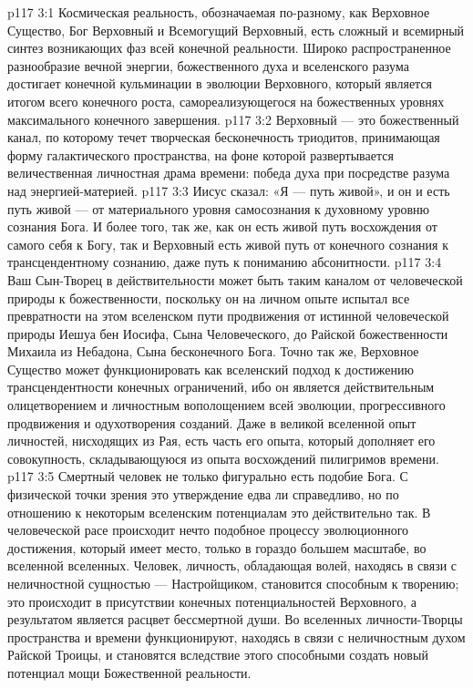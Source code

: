 \vs p117 3:1 Космическая реальность, обозначаемая по\hyp{}разному, как Верховное Существо, Бог Верховный и Всемогущий Верховный, есть сложный и всемирный синтез возникающих фаз всей конечной реальности. Широко распространенное разнообразие вечной энергии, божественного духа и вселенского разума достигает конечной кульминации в эволюции Верховного, который является итогом всего конечного роста, самореализующегося на божественных уровнях максимального конечного завершения.
\vs p117 3:2 Верховный --- это божественный канал, по которому течет творческая бесконечность триодитов, принимающая форму галактического пространства, на фоне которой развертывается величественная личностная драма времени: победа духа при посредстве разума над энергией\hyp{}материей.
\vs p117 3:3 \pc Иисус сказал: «Я --- путь живой», и он и есть путь живой --- от материального уровня самосознания к духовному уровню сознания Бога. И более того, так же, как он есть живой путь восхождения от самого себя к Богу, так и Верховный есть живой путь от конечного сознания к трансцендентному сознанию, даже путь к пониманию абсонитности.
\vs p117 3:4 Ваш Сын\hyp{}Творец в действительности может быть таким каналом от человеческой природы к божественности, поскольку он на личном опыте испытал все превратности на этом вселенском пути продвижения от истинной человеческой природы Иешуа бен Иосифа, Сына Человеческого, до Райской божественности Михаила из Небадона, Сына бесконечного Бога. Точно так же, Верховное Существо может функционировать как вселенский подход к достижению трансцендентности конечных ограничений, ибо он является действительным олицетворением и личностным вополощением всей эволюции, прогрессивного продвижения и одухотворения созданий. Даже в великой вселенной опыт личностей, нисходящих из Рая, есть часть его опыта, который дополняет его совокупность, складывающуюся из опыта восхождений пилигримов времени.
\vs p117 3:5 \pc Смертный человек не только фигурально есть подобие Бога. С физической точки зрения это утверждение едва ли справедливо, но по отношению к некоторым вселенским потенциалам это действительно так. В человеческой расе происходит нечто подобное процессу эволюционного достижения, который имеет место, только в гораздо большем масштабе, во вселенной вселенных. Человек, личность, обладающая волей, находясь в связи с неличностной сущностью --- Настройщиком, становится способным к творению; это происходит в присутствии конечных потенциальностей Верховного, а результатом является расцвет бессмертной души. Во вселенных личности\hyp{}Творцы пространства и времени функционируют, находясь в связи с неличностным духом Райской Троицы, и становятся вследствие этого способными создать новый потенциал мощи Божественной реальности.

